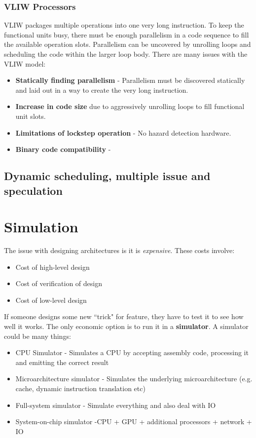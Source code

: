 \documentclass[11pt]{article}
\begin{document}
\subsubsection{VLIW Processors}
VLIW packages multiple operations into one very long instruction. To keep the functional units busy, there must be enough parallelism in a code sequence to fill the available operation slots. Parallelism can be uncovered by unrolling loops and scheduling the code within the larger loop body. 
\n
There are many issues with the VLIW model:
\begin{itemize}
\item \textbf{Statically finding parallelism} - Parallelism must be discovered statically and laid out in a way to create the very long instruction.
\item \textbf{Increase in code size} due to aggressively unrolling loops to fill functional unit slots.
\item \textbf{Limitations of lockstep operation} - No hazard detection hardware. 
\item \textbf{Binary code compatibility} - 
\end{itemize}

\subsection{Dynamic scheduling, multiple issue and speculation}

\section{Simulation}
The issue with designing architectures is it is \textit{expensive}. These costs involve:
\begin{itemize}
\item Cost of high-level design
\item Cost of verification of design
\item Cost of low-level design
\end{itemize}
If someone designs some new ``trick" for feature, they have to test it to see how well it works. The only economic option is to run it in a \textbf{simulator}.
\n
A simulator could be many things:
\begin{itemize}
\item CPU Simulator - Simulates a CPU by accepting assembly code, processing it and emitting the correct result
\item Microarchitecture simulator - Simulates the underlying microarchitecture (e.g. cache, dynamic instruction translation etc)
\item Full-system simulator - Simulate everything and also deal with IO
\item System-on-chip simulator -CPU + GPU + additional processors + network + IO
\end{itemize}
\end{document}
